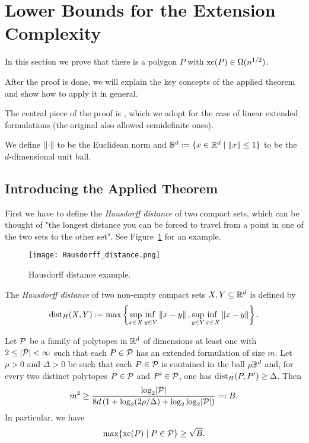 \section{Lower Bounds for the Extension Complexity}

In this section we prove that there is a polygon $P$ with $\xc(P) \in \Omega(n^{1/2})$.

After the proof is done, we will explain the key concepts of the applied theorem and show how to apply it in general.

The central piece of the proof is \cite[Theorem~1]{averkov2016maximum}, which we adopt for the case of linear extended formulations (the original also allowed semidefinite ones).

We define $\norm{\cdot}$ to be the Euclidean norm and $\B^d := \{ x \in \R^d \mid \norm{x} \leq 1 \}$ to be the $d$-dimensional unit ball.



\subsection{Introducing the Applied Theorem}

First we have to define the \emph{Hausdorff distance} of two compact sets, which can be thought of "the longest distance you can be forced to travel from a point in one of the two sets to the other set". See Figure~\ref{fig:hausdorff} for an example.

\begin{figure}[ht]
  \centering
  \texttt{[image: Hausdorff\_distance.png]}
  \caption{Hausdorff distance example. \cite{rocchini2007hausdorff}}
  \label{fig:hausdorff}
\end{figure}

\begin{definition}
  The \emph{Hausdorff distance} of two non-empty compact sets $X, Y \subseteq \R^d$ is defined by $$ \dist_H(X,Y) := \max \left\{ \adjustlimits \sup_{x \in X} \inf_{y \in Y} \norm{x-y}, \adjustlimits \sup_{y \in Y} \inf_{x \in X} \norm{x-y} \right\} .$$
\end{definition}

\begin{theorem}\label{theorem:family}
  Let $\P$ be a family of polytopes in $\R^d$ of dimensions at least one with $2 \leq \abs{\P} < \infty $ such that each $P \in \P$ has an extended formulation of size $m$.
  Let $\rho > 0$ and $\Delta > 0$ be such that each $P \in \P$ is contained in the ball $\rho \B^d$ and, 
  for every two distinct polytopes $P \in \P$ and $P' \in \P$, one has $\dist_H(P, P') \geq \Delta$. 
  Then $$m^2 \geq \frac{\log_2 \abs{\P}}{8d \left(1 + \log_2 (2\rho/\Delta) + \log_2\log_2 \abs{\P} \right)} =: B.$$
  In particular, we have $$\max \{\xc(P) \mid P \in \P\}  \geq \sqrt{B} .$$
\end{theorem}



